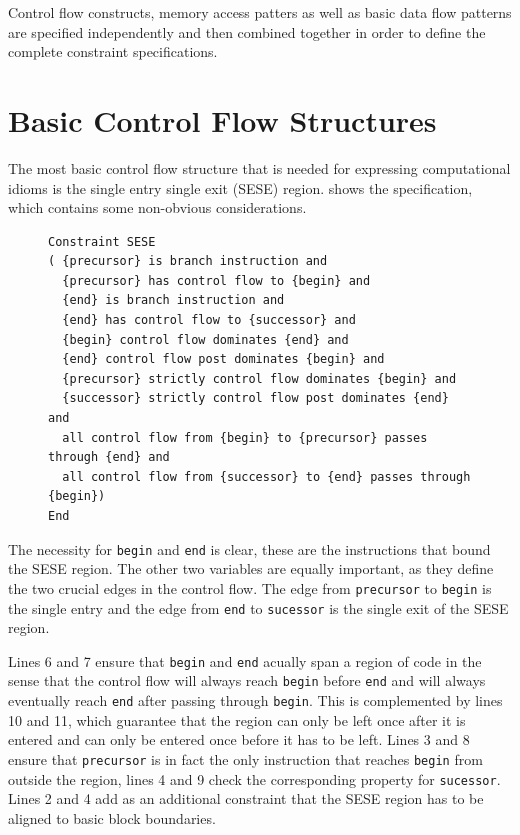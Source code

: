     Control flow constructs, memory access patters as well as basic data flow
    patterns are specified independently and then combined together in order to
    define the complete constraint specifications.


\section{Basic Control Flow Structures}

    The most basic control flow structure that is needed for expressing
    computational idioms is the single entry single exit (SESE) region.
     shows the specification, which contains some
    non-obvious considerations.

\begin{figure}[h]
\begin{lstlisting}[language=CAnDL,label={candl_sese},caption=
   {Single Entry Single Exit Regions}]
Constraint SESE
( {precursor} is branch instruction and
  {precursor} has control flow to {begin} and
  {end} is branch instruction and
  {end} has control flow to {successor} and
  {begin} control flow dominates {end} and
  {end} control flow post dominates {begin} and
  {precursor} strictly control flow dominates {begin} and
  {successor} strictly control flow post dominates {end} and
  all control flow from {begin} to {precursor} passes through {end} and
  all control flow from {successor} to {end} passes through {begin})
End
\end{lstlisting}
\end{figure}

    The necessity for {\tt begin} and {\tt end} is clear, these are the
    instructions that bound the SESE region.
    The other two variables are equally important, as they define the two
    crucial edges in the control flow.
    The edge from {\tt precursor} to {\tt begin} is the
    single entry and the edge from {\tt end} to {\tt sucessor} is the single
    exit of the SESE region.

    Lines 6 and 7 ensure that {\tt begin} and {\tt end} acually span a region of
    code in the sense that the control flow will always reach {\tt begin} before
    {\tt end} and will always eventually reach {\tt end} after passing through
    {\tt begin}.
    This is complemented by lines 10 and 11, which guarantee that the region can
    only be left once after it is entered and can only be entered once before it
    has to be left.
    Lines 3 and 8 ensure that {\tt precursor} is in fact the only instruction
    that reaches {\tt begin} from outside the region, lines 4 and 9 check the
    corresponding property for {\tt sucessor}.
    Lines 2 and 4 add as an additional constraint that the SESE region has to be
    aligned to basic block boundaries.

